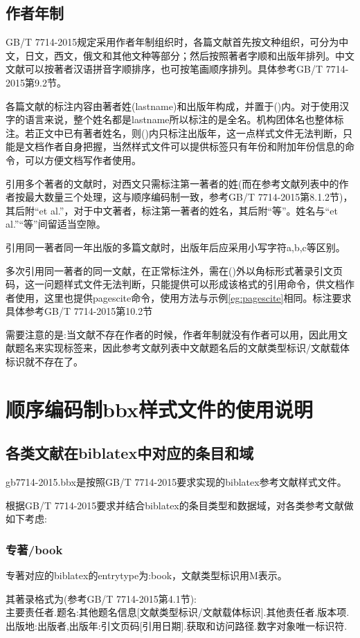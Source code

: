 \documentclass[11pt]{article} %
\begin{document}
\subsection{作者年制}

GB/T 7714-2015规定采用作者年制组织时，各篇文献首先按文种组织，可分为中文，日文，西文，俄文和其他文种等部分；然后按照著者字顺和出版年排列。中文文献可以按著者汉语拼音字顺排序，也可按笔画顺序排列。具体参考GB/T 7714-2015第9.2节。


各篇文献的标注内容由著者姓(lastname)和出版年构成，并置于()内。对于使用汉字的语言来说，整个姓名都是lastname所以标注的是全名。机构团体名也整体标注。若正文中已有著者姓名，则()内只标注出版年，这一点样式文件无法判断，只能是文档作者自身把握，当然样式文件可以提供标签只有年份和附加年份信息的命令，可以方便文档写作者使用。

引用多个著者的文献时，对西文只需标注第一著者的姓(而在参考文献列表中的作者按最大数量三个处理，这与顺序编码制一致，参考GB/T 7714-2015第8.1.2节)，其后附“et al.”，对于中文著者，标注第一著者的姓名，其后附“等”。姓名与“et al.”“等”间留适当空隙。

引用同一著者同一年出版的多篇文献时，出版年后应采用小写字符a,b,c等区别。

多次引用同一著者的同一文献，在正常标注外，需在()外以角标形式著录引文页码，这一问题样式文件无法判断，只能提供可以形成该格式的引用命令，供文档作者使用，这里也提供pagescite命令，使用方法与示例\ref{eg:pagescite}相同。标注要求具体参考GB/T 7714-2015第10.2节

需要注意的是:当文献不存在作者的时候，作者年制就没有作者可以用，因此用文献题名来实现标签来，因此参考文献列表中文献题名后的文献类型标识/文献载体标识就不存在了。


\section{顺序编码制bbx样式文件的使用说明}

\subsection{各类文献在biblatex中对应的条目和域}\label{sec:numeric:data}
gb7714-2015.bbx是按照GB/T 7714-2015要求实现的biblatex参考文献样式文件。

根据GB/T 7714-2015要求并结合biblatex的条目类型和数据域，对各类参考文献做如下考虑:
\subsubsection{专著/book}
\begin{refentry}{}{}
专著对应的biblatex的entrytype为:book，文献类型标识用M表示。

其著录格式为(参考GB/T 7714-2015第4.1节):\\
主要责任者.题名:其他题名信息[文献类型标识/文献载体标识].其他责任者.版本项.出版地:出版者,出版年:引文页码[引用日期].获取和访问路径.数字对象唯一标识符.
\end{refentry}
\end{document}
